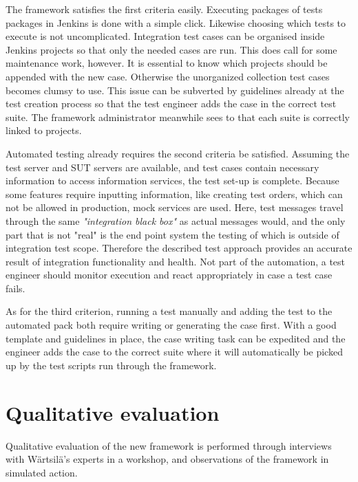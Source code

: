 \documentclass[12pt,a4paper,oneside,pdftex]{report}
\begin{document}
{The framework satisfies the first criteria easily. Executing packages of tests packages in Jenkins is done with a simple click. Likewise choosing which tests to execute is not uncomplicated. Integration test cases can be organised inside Jenkins projects so that only the needed cases are run. This does call for some maintenance work, however. It is essential to know which projects should be appended with the new case. Otherwise the unorganized collection test cases becomes clumsy to use. This issue can be subverted by guidelines already at the test creation process so that the test engineer adds the case in the correct test suite. The framework administrator meanwhile sees to that each suite is correctly linked to projects.

Automated testing already requires the second criteria be satisfied. Assuming the test server and SUT servers are available, and test cases contain necessary information to access information services, the test set-up is complete. Because some features require inputting information, like creating test orders, which can not be allowed in production, mock services are used. Here, test messages travel through the same \emph{"integration black box"} as actual messages would, and the only part that is not "real" is the end point system the testing of which is outside of integration test scope. Therefore the described test approach provides an accurate result of integration functionality and health. Not part of the automation, a test engineer should monitor execution and react appropriately in case a test case fails.

As for the third criterion, running a test manually and adding the test to the automated pack both require writing or generating the case first. With a good template and guidelines in place, the case writing task can be expedited and the engineer adds the case to the correct suite where it will automatically be picked up by the test scripts run through the framework.

\section{Qualitative evaluation}

Qualitative evaluation of the new framework is performed through interviews with Wärtsilä's experts in a workshop, and observations of the framework in simulated action.


}
\end{document}
